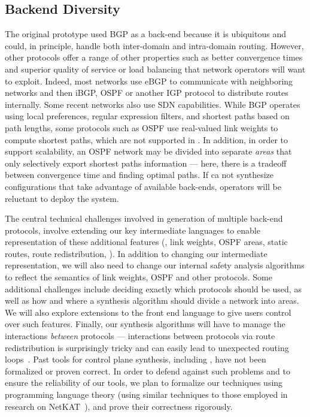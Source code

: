 \subsection{Backend Diversity}
\label{sec:diversity}

The original \Propane prototype used BGP as a back-end because it is ubiquitous and
could, in principle, handle both inter-domain and 
intra-domain routing.  However, other protocols offer a range of other properties
such as better convergence times and superior quality of service or load balancing that network operators 
will want to exploit.  
%
Indeed, most networks use
eBGP to communicate with neighboring networks and 
then iBGP, OSPF or another IGP protocol to distribute routes internally.
Some recent networks also use SDN capabilities.
While BGP operates using local preferences, regular expression filters,
and shortest paths based on path lengths, some protocols such as OSPF
use real-valued link weights to compute shortest paths, which are not
supported in \Propane.  In addition, in order to support scalability, 
an OSPF network may be divided into separate \emph{areas} that only selectively
export shortest paths information --- here, there is a tradeoff between 
convergence time and finding optimal paths.  
If \Name ca not synthesize configurations that take advantage of available
back-ends, operators will be reluctant to deploy the system.

The central technical challenges involved in generation of multiple back-end protocols, involve
extending our key intermediate languages to enable representation 
of these additional features (\eg, link weights, OSPF areas, static routes,
route redistribution, \etc).  
In addition to changing our intermediate representation, we will also need to 
change our internal safety analysis algorithms to reflect the semantics of 
link weights, OSPF and other protocols.
Some additional challenges include deciding exactly which protocols should be used,
as well as how and where
a synthesis algorithm should divide a network into areas.  We will also
explore extensions to the \Name front end language to give users
control over such features.
Finally, our synthesis algorithms will have to manage the interactions
\emph{between} protocols --- interactions between protocols via route redistribution
is surprisingly tricky and can easily lead to unexpected routing loops~\cite{cisco-route-redistribution}.
Past tools for control plane synthesis, including \Propane, have not been formalized or proven correct. 
In order to defend against such problems and to ensure the reliability of our tools, we plan to formalize 
our techniques using programming language
theory (using similar techniques to those employed in research on NetKAT~\cite{netkat}), and prove their correctness
rigorously.


